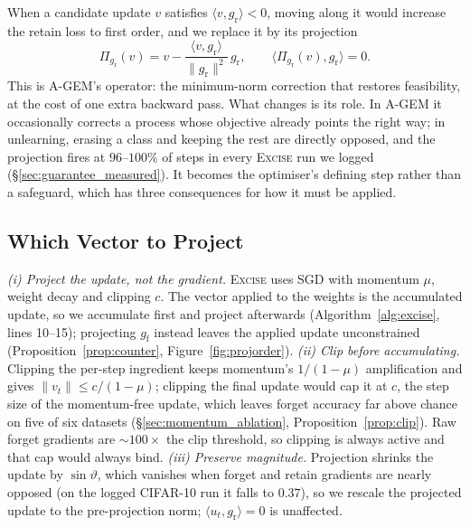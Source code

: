 \documentclass{article}
\newcommand{\ours}{\textsc{Excise}}
\newcommand{\gf}{g_{\mathrm{f}}}
\newcommand{\gr}{g_{\mathrm{r}}}
\newcommand{\rev}[1]{{\color{revisedB}#1}}
\theoremstyle{remark}
\theoremstyle{plain}
\begin{document}
When a candidate update $v$ satisfies $\langle v,\gr\rangle < 0$, moving along it
would increase the retain loss to first order, and we replace it by its
projection
\begin{equation}\label{eq:projection}
\Pi_{\gr}(v) = v - \frac{\langle v,\gr\rangle}{\|\gr\|^2}\,\gr,
\qquad \langle \Pi_{\gr}(v),\gr\rangle = 0 .
\end{equation}
This is A-GEM's operator: the minimum-norm correction that restores
feasibility, at the cost of one extra backward pass. What changes is its role.
In A-GEM it occasionally corrects a process whose objective already points the
right way; in unlearning, erasing a class and keeping the rest are directly
opposed, and the projection fires at \rev{$96$--$100\%$ of steps in every \ours{}
run we logged} (\S\ref{sec:guarantee_measured}). It becomes the optimiser's defining step rather
than a safeguard, which has three consequences for how it must be applied.

\subsection{Which Vector to Project}\label{sec:optimiser}

\emph{(i) Project the update, not the gradient.} \ours{} uses SGD with momentum
$\mu$, weight decay and clipping $c$. The vector applied to the weights is the
accumulated update, so we accumulate first and project afterwards
(Algorithm~\ref{alg:excise}, lines 10--15); projecting $\gf$ instead leaves the
applied update unconstrained (Proposition~\ref{prop:counter},
Figure~\ref{fig:projorder}). \emph{(ii) Clip before accumulating.} Clipping the
per-step ingredient keeps momentum's $1/(1-\mu)$ amplification and gives
$\|v_t\| \le c/(1-\mu)$; clipping the final update would cap it at $c$\rev{,
the step size of the momentum-free update, which leaves forget accuracy far
above chance on five of six datasets (\S\ref{sec:momentum_ablation},
Proposition~\ref{prop:clip}). Raw forget gradients are ${\sim}100\times$ the
clip threshold, so clipping is always active and that cap would always bind.}
\emph{(iii) Preserve magnitude.} Projection shrinks the update by
$\sin\vartheta$, which vanishes when forget and retain gradients are nearly
opposed \rev{(on the logged CIFAR-10 run it falls to $0.37$)}, so we rescale the
projected update to the pre-projection norm; $\langle u_t,\gr\rangle = 0$ is
unaffected.
\end{document}
